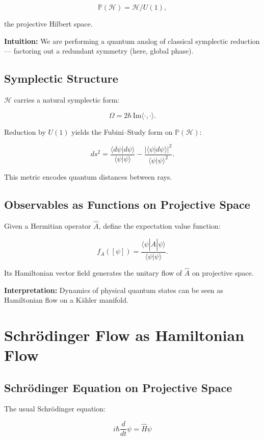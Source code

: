 \documentclass[11pt]{book}
\begin{document}
\[
\mathbb{P}(\mathcal{H}) = \mathcal{H} / U(1),
\]

the projective Hilbert space.  

\textbf{Intuition:} We are performing a quantum analog of classical symplectic reduction — factoring out a redundant symmetry (here, global phase).

\section{Symplectic Structure}

$\mathcal{H}$ carries a natural symplectic form:

\[
\Omega = 2\hbar \, \text{Im} \langle \cdot, \cdot \rangle.
\]

Reduction by $U(1)$ yields the Fubini–Study form on $\mathbb{P}(\mathcal{H})$:

\[
ds^2 = \frac{\langle d\psi | d\psi \rangle}{\langle \psi | \psi \rangle} - \frac{|\langle \psi | d\psi \rangle|^2}{\langle \psi | \psi \rangle^2}.
\]

This metric encodes quantum distances between rays.

\section{Observables as Functions on Projective Space}

Given a Hermitian operator $\hat{A}$, define the expectation value function:

\[
f_A([\psi]) = \frac{\langle \psi | \hat A | \psi \rangle}{\langle \psi | \psi \rangle}.
\]

Its Hamiltonian vector field generates the unitary flow of $\hat{A}$ on projective space.

\textbf{Interpretation:} Dynamics of physical quantum states can be seen as Hamiltonian flow on a Kähler manifold.


\chapter{Schrödinger Flow as Hamiltonian Flow}

\section{Schrödinger Equation on Projective Space}

The usual Schrödinger equation:

\[
i\hbar \frac{d}{dt} \psi = \hat H \psi
\]
\end{document}
